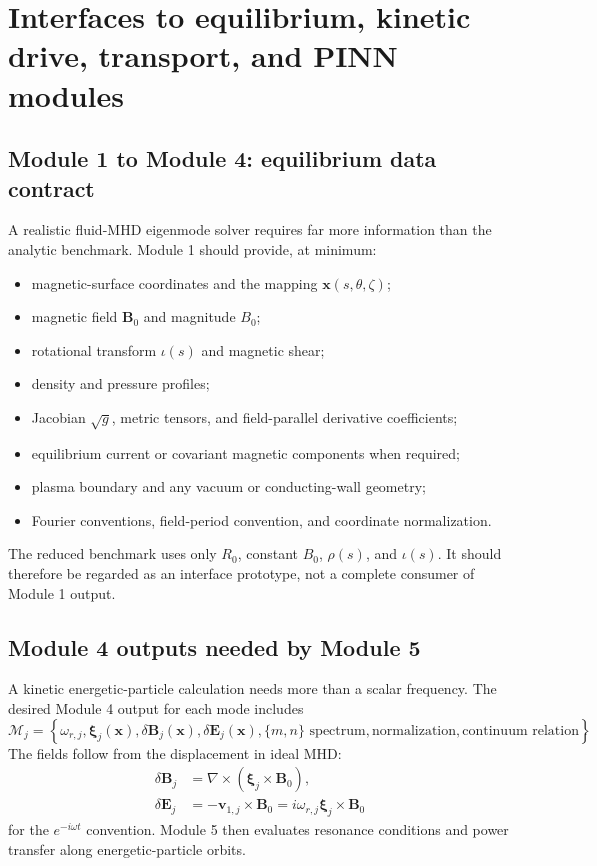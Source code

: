 \section{Interfaces to equilibrium, kinetic drive, transport, and PINN modules}
\label{sec:interfaces}

\subsection{Module 1 to Module 4: equilibrium data contract}
A realistic fluid-MHD eigenmode solver requires far more information than the analytic benchmark. Module 1 should provide, at minimum:
\begin{itemize}[leftmargin=1.6em]
\item magnetic-surface coordinates and the mapping $\mathbf x(s,\theta,\zeta)$;
\item magnetic field $\mathbf B_0$ and magnitude $B_0$;
\item rotational transform $\iota(s)$ and magnetic shear;
\item density and pressure profiles;
\item Jacobian $\sqrt g$, metric tensors, and field-parallel derivative coefficients;
\item equilibrium current or covariant magnetic components when required;
\item plasma boundary and any vacuum or conducting-wall geometry;
\item Fourier conventions, field-period convention, and coordinate normalization.
\end{itemize}
The reduced benchmark uses only $R_0$, constant $B_0$, $\rho(s)$, and $\iota(s)$. It should therefore be regarded as an interface prototype, not a complete consumer of Module 1 output.

\subsection{Module 4 outputs needed by Module 5}
A kinetic energetic-particle calculation needs more than a scalar frequency. The desired Module 4 output for each mode includes
\begin{equation}
\mathcal M_j=
\left\{
\omega_{r,j},
\boldsymbol\xi_j(\mathbf x),
\delta\mathbf B_j(\mathbf x),
\delta\mathbf E_j(\mathbf x),
\{m,n\}\text{ spectrum},
\text{normalization},
\text{continuum relation}
\right\}.
\end{equation}
The fields follow from the displacement in ideal MHD:
\begin{align}
\delta\mathbf B_j&=\nabla\times(\boldsymbol\xi_j\times\mathbf B_0),\\
\delta\mathbf E_j&=-\mathbf v_{1,j}\times\mathbf B_0
=i\omega_{r,j}\boldsymbol\xi_j\times\mathbf B_0
\end{align}
for the $e^{-i\omega t}$ convention. Module 5 then evaluates resonance conditions and power transfer along energetic-particle orbits.

